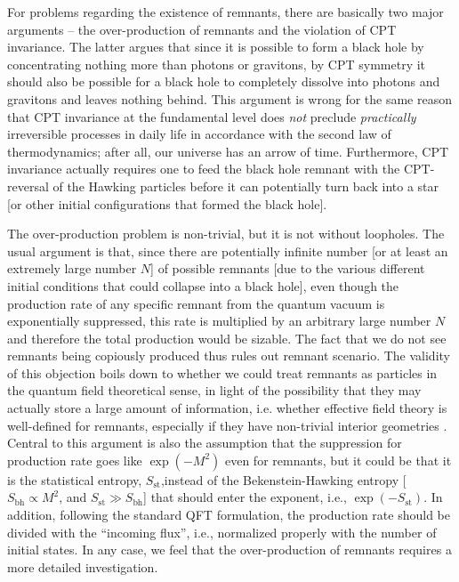 \documentclass[12pt]{article}
\newcommand{\2}{$^2$}
\newcommand{\3}{$^3$}
\newcommand{\4}{$_4$}
\newcommand{\5}{$_5$}
\begin{document}
For problems regarding the existence of remnants, there are basically two major arguments -- the over-production of remnants and the violation of CPT invariance. The latter argues that since it is possible to form a black hole by concentrating nothing more than photons or gravitons, by CPT symmetry it should also be possible for a black hole to completely dissolve into photons and gravitons and leaves nothing behind. This argument is wrong for the same reason that CPT invariance at the fundamental level does \emph{not} preclude \emph{practically} irreversible processes in daily life in accordance with the second law of thermodynamics; after all, our universe has an arrow of time. Furthermore, CPT invariance actually requires one to feed the black hole remnant with the CPT-reversal of the Hawking particles before it can potentially turn back into a star [or other initial configurations that formed the black hole].

The over-production problem is non-trivial, but it is not without loopholes. The usual argument is that, since there are potentially infinite number [or at least an extremely large number $N$] of possible remnants [due to the various different initial conditions that could collapse into a black hole], even though the production rate of any specific remnant from the quantum vacuum is exponentially suppressed, this rate is multiplied by an arbitrary large number $N$ and therefore the total production would be sizable. The fact that we do not see remnants being copiously produced thus rules out remnant scenario. The validity of this objection boils down to whether we could treat remnants as particles in the quantum field theoretical sense, in light of the possibility that they may actually store a large amount of information, i.e. whether effective field theory is well-defined for remnants, especially if they have non-trivial interior geometries \cite{sabine}. Central to this argument is also the assumption that the suppression for production rate goes like $\exp(-M^2)$ even for remnants, but it could be that it is the statistical entropy, $S_{\text{st}}$,instead of the Bekenstein-Hawking entropy [$S_{\text{bh}} \propto M^2$, and $S_{\text{st}} \gg S_{\text{bh}}$] that should enter the exponent, i.e., $\exp(-S_{\text{st}})$. In addition, following the standard QFT formulation, the production rate should be divided with the ``incoming flux'', i.e., normalized properly with the number of initial states.
In any case, we feel that the over-production of remnants requires a more detailed investigation.
\end{document}
